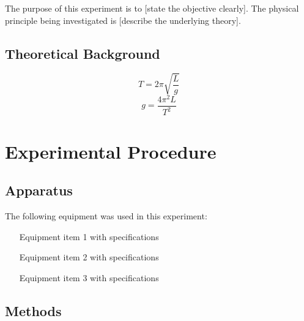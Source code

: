\documentclass[11pt,a4paper]{article}
\begin{document}
The purpose of this experiment is to [state the objective clearly]. The physical principle being investigated is [describe the underlying theory].

\subsection{Theoretical Background}

\begin{equation}
    \label{eq:theory}
    T = 2\pi\sqrt{\frac{L}{g}}
\end{equation}
%
\begin{equation}
    \label{eq:gravity}
    g = \frac{4\pi^2 L}{T^2}
\end{equation}


\section{Experimental Procedure}
\label{sec:procedure}

\subsection{Apparatus}

The following equipment was used in this experiment:
\begin{itemize}
    \item [Equipment item 1 with specifications]
    \item [Equipment item 2 with specifications]
    \item [Equipment item 3 with specifications]
\end{itemize}


\subsection{Methods}
\end{document}
